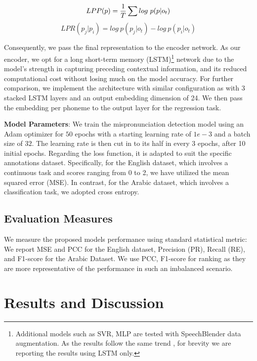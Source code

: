 \documentclass{INTERSPEECH2023}
\begin{document}
\begin{equation}
\label{eq:lpp}
\begin{small}
LPP(p) = \frac{1}{T} \sum log\ p(p|o_t)
\end{small}
\end{equation}
\begin{equation}
\label{eq:lpr}
LPR(p_j|p_i) = log\ p(p_j|o_t) - log\ p(p_i|o_t)
\end{equation}

\noindent Consequently, we pass the final representation to the encoder network. As our encoder, we opt for a long short-term memory (LSTM)\footnote{Additional models such as SVR\cite{speechocean}, MLP are tested with SpeechBlender data augmentation. As the results follow the same trend , for brevity we are reporting the results using LSTM only.}
network due to the model's strength in capturing preceding contextual information, and its reduced computational cost without losing much on the model accuracy. For further comparison, we implement the architecture with similar configuration as \cite{JIM} with 3 stacked LSTM layers and an output embedding dimension of 24. We then pass the embedding per phoneme to the output layer for the regression task.

\noindent\textbf{Model Parameters}: We train the mispronunciation detection model using an Adam optimizer for $50$ epochs with a starting learning rate of $1e-3$ and a batch size of $32$. The learning rate is then cut in to its half in every 3 epochs, after 10 initial epochs. 
Regarding the loss function, it is adapted to suit the specific annotations dataset. Specifically, for the English dataset, which involves a continuous task and scores ranging from 0 to 2, we have utilized the mean squared error (MSE). In contrast, for the Arabic dataset, which involves a classification task, we adopted cross entropy.


\subsection{Evaluation Measures}
We measure the proposed models performance using standard statistical metric: 
We report MSE and PCC for the English dataset, Precision (PR), Recall (RE), and F1-score for the Arabic Dataset. We use PCC, F1-score for ranking as they are more representative of the performance in such an imbalanced scenario. 


\section{Results and Discussion}
\end{document}
